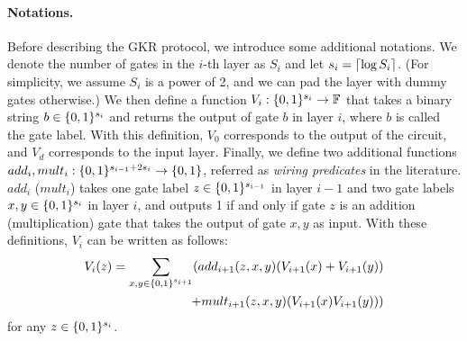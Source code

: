 \paragraph{Notations.} Before describing the GKR protocol, we introduce some additional notations. We denote the number of gates in the $i$-th layer as $S_i$ and let $s_i = {\lceil \log S_i \rceil}$. (For simplicity, we assume $S_i$ is a power of 2, and we can pad the layer with dummy gates otherwise.) We then define a function $V_i:\{0,1\}^{s_i}\rightarrow\mathbb{F}$ that takes a binary string $b\in\{0,1\}^{s_i}$ and returns the output of gate $b$ in layer $i$, where $b$ is called the gate label. With this definition, $V_0$ corresponds to the output of the circuit, and $V_d$ corresponds to the input layer. Finally, we define two additional functions $add_i, mult_i: \{0,1\}^{s_{i-1}+2s_i}\rightarrow\{0,1\}$, referred as \emph{wiring predicates} in the literature. $add_i$ ($mult_i$) takes one gate label $z\in\{0,1\}^{s_{i-1}}$ in layer $i-1$ and two gate labels $x,y\in\{0,1\}^{s_i}$ in layer $i$, and outputs 1 if and only if gate $z$ is an addition (multiplication) gate that takes the output of gate $x,y$ as input. With these definitions, $V_i$ can be written as follows:
\begin{equation}
    \begin{aligned}
	V_i(z)=\sum_{x, y \in\{0,1\}^{s_{i+1}}}(add_{i+1}(z,x,y)(V_{i+1}(x)+V_{i+1}(y))\\
	+mult_{i+1}(z,x,y)(V_{i+1}(x)V_{i+1}(y)))
	\end{aligned}
\end{equation}
for any $z\in\{0,1\}^{s_i}$. 










